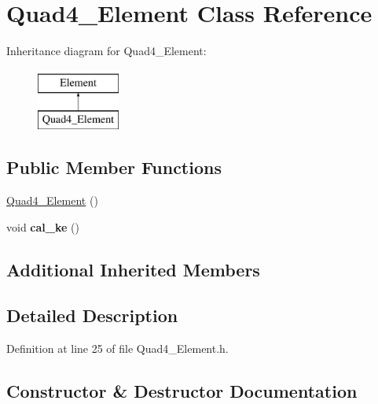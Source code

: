 \hypertarget{class_quad4___element}{}\section{Quad4\+\_\+\+Element Class Reference}
\label{class_quad4___element}
Inheritance diagram for Quad4\+\_\+\+Element\+:\begin{figure}[H]
\begin{center}
\leavevmode
\includegraphics[height=2.000000cm]{class_quad4___element}
\end{center}
\end{figure}
\subsection*{Public Member Functions}
\begin{DoxyCompactItemize}
\item 
\mbox{\hyperlink{class_quad4___element_ac07432e0180b75c6acb534e2327950a7}{Quad4\+\_\+\+Element}} ()
\item 
\mbox{\label{class_quad4___element_a6fa23c1b93f10c991b2155f764aa6d19}} 
void {\bfseries cal\+\_\+ke} ()
\end{DoxyCompactItemize}
\subsection*{Additional Inherited Members}


\subsection{Detailed Description}


Definition at line 25 of file Quad4\+\_\+\+Element.\+h.



\subsection{Constructor \& Destructor Documentation}
\mbox{\label{class_quad4___element_ac07432e0180b75c6acb534e2327950a7}} 
